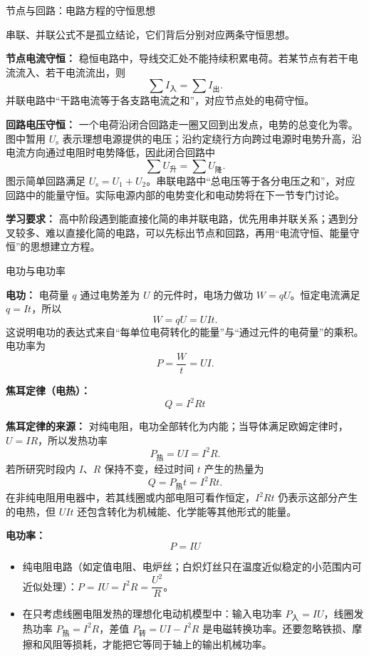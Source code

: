 \begin{conceptbox}{节点与回路：电路方程的守恒思想}

\begin{center}


\label{fig:kirchhoff-circuit-laws}
\end{center}

串联、并联公式不是孤立结论，它们背后分别对应两条守恒思想。

\textbf{节点电流守恒：} 稳恒电路中，导线交汇处不能持续积累电荷。若某节点有若干电流流入、若干电流流出，则
\[
\sum I_{\text{入}}=\sum I_{\text{出}}.
\]
并联电路中“干路电流等于各支路电流之和”，对应节点处的电荷守恒。

\textbf{回路电压守恒：} 一个电荷沿闭合回路走一圈又回到出发点，电势的总变化为零。图中暂用 $U_{\mathrm s}$ 表示理想电源提供的电压；沿约定绕行方向跨过电源时电势升高，沿电流方向通过电阻时电势降低，因此闭合回路中
\[
\sum U_{\text{升}}=\sum U_{\text{降}}.
\]
图示简单回路满足 $U_{\mathrm s}=U_1+U_2$。串联电路中“总电压等于各分电压之和”，对应回路中的能量守恒。实际电源内部的电势变化和电动势将在下一节专门讨论。

\textbf{学习要求：} 高中阶段遇到能直接化简的串并联电路，优先用串并联关系；遇到分叉较多、难以直接化简的电路，可以先标出节点和回路，再用“电流守恒、能量守恒”的思想建立方程。

\end{conceptbox}

\begin{conceptbox}{电功与电功率}

\textbf{电功：} 电荷量 $q$ 通过电势差为 $U$ 的元件时，电场力做功 $W=qU$。恒定电流满足 $q=It$，所以
\[
W=qU=UIt.
\]
这说明电功的表达式来自“每单位电荷转化的能量”与“通过元件的电荷量”的乘积。电功率为
\[
P=\frac{W}{t}=UI.
\]

\textbf{焦耳定律（电热）：}
\[
Q = I^2 Rt
\]

\textbf{焦耳定律的来源：} 对纯电阻，电功全部转化为内能；当导体满足欧姆定律时，$U=IR$，所以发热功率
\[
P_{\text{热}}=UI=I^2R.
\]
若所研究时段内 $I$、$R$ 保持不变，经过时间 $t$ 产生的热量为
\[
Q=P_{\text{热}}t=I^2Rt.
\]
在非纯电阻用电器中，若其线圈或内部电阻可看作恒定，$I^2Rt$ 仍表示这部分产生的电热，但 $UIt$ 还包含转化为机械能、化学能等其他形式的能量。

\textbf{电功率：}
\[
\boxed{P = IU}
\]

\begin{itemize}
  \item 纯电阻电路（如定值电阻、电炉丝；白炽灯丝只在温度近似稳定的小范围内可近似处理）：$P = IU = I^2R = \dfrac{U^2}{R}$。
  \item 在只考虑线圈电阻发热的理想化电动机模型中：输入电功率 $P_{\text{入}}=IU$，线圈发热功率 $P_{\text{热}}=I^2R$，差值 $P_{\text{转}}=UI-I^2R$ 是电磁转换功率。还要忽略铁损、摩擦和风阻等损耗，才能把它等同于轴上的输出机械功率。
\end{itemize}

\end{conceptbox}

